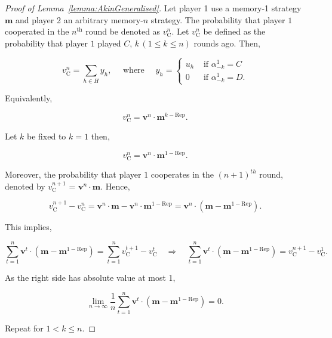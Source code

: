 \documentclass[11pt]{article}
\theoremstyle{plainCl1}
\theoremstyle{plainCl2}
\begin{document}
\begin{proof}[Proof of Lemma~\ref{lemma:AkinGeneralised}]
Let player 1 use a memory-1 strategy $\mathbf{m}$ and player 2 an arbitrary
memory-$n$ strategy. The probability that player $1$ cooperated in the
\(n^{\text{th}}\) round be denoted as \(v_{\text{C}}^{n}\). Let
\(v_{\text{C}}^{n}\) be defined as the probability that player $1$ played \(C\),
\(k \, (1\leq k\leq n)\) rounds ago. Then,

$$
v_{\text{C}}^{n} = \sum_{h \in H} y_{h}, \quad \text{ where } \quad y_h = 
\begin{cases}
 u_{h} & \text{ if } \alpha^1_{-k} = C \\
     0 & \text{ if } \alpha^1_{-k} = D.
\end{cases}
$$

Equivalently,

$$
v_{\text{C}}^{n} = \mathbf{v}^{n} \cdot \mathbf{m}^{k - \text{Rep}}.
$$

Let $k$ be fixed to $k=1$ then,

$$
v_{\text{C}}^{n} = \mathbf{v}^{n} \cdot \mathbf{m}^{1 - \text{Rep}}.
$$

Moreover, the probability that player $1$ cooperates in the \((n + 1)^{th}\) round,
denoted by \(v_{\text{C}}^{n + 1}\) = \(\mathbf{v}^{n} \cdot \mathbf{m}\). Hence,

\begin{equation*}
  v_{\text{C}}^{n + 1} - v_{\text{C}}^{n} = \mathbf{v}^{n} \cdot \mathbf{m} - \mathbf{v}^n \cdot \mathbf{m}^{1 - \text{Rep}}
  =  \mathbf{v}^{n} \cdot (\mathbf{m} - \mathbf{m}^{1 - \text{Rep}}).
\end{equation*}

This implies,

\begin{equation*}
\sum^{n}_{t=1} \mathbf{v}^{t} \cdot (\mathbf{m} - \mathbf{m}^{1 - \text{Rep}}) = \sum^{n}_{t=1} v_{\text{C}}^{t + 1} - v_{\text{C}}^{t} \quad \Rightarrow \quad \sum^{n}_{t=1} \mathbf{v}^{t} \cdot (\mathbf{m} - \mathbf{m}^{1 - \text{Rep}}) =  v_{\text{C}}^{n + 1} - v_{\text{C}}^{1}.
\end{equation*}

As the right side has absolute value at most 1,

\begin{equation*}
\lim_{n \rightarrow \infty} \frac{1}{n} \sum^{n}_{t=1} \mathbf{v}^{t} \cdot (\mathbf{m} - \mathbf{m}^{1 - \text{Rep}}) = 0.
\end{equation*}

Repeat for $1 < k \leq n$.

\end{proof}
\end{document}
